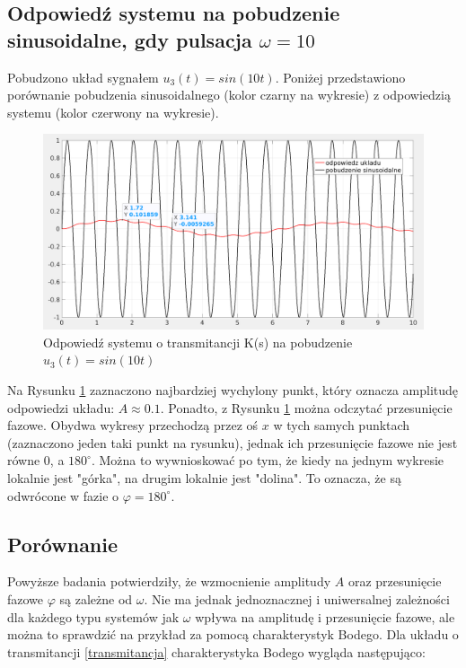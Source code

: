 \documentclass[12pt]{article}
\begin{document}
\subsection{Odpowiedź systemu na pobudzenie sinusoidalne, gdy pulsacja $\omega = 10$}
Pobudzono układ sygnałem $u_3(t)=sin(10 t)$. Poniżej przedstawiono porównanie pobudzenia sinusoidalnego (kolor czarny na wykresie) z odpowiedzią systemu (kolor czerwony na wykresie).
\begin{figure}[H]
    \centering
    \includegraphics[scale=0.2]{2.3.png}
    \caption{Odpowiedź systemu o transmitancji K(s) na pobudzenie $u_3(t)=sin(10 t)$}
    \label{fig:2.3}
\end{figure}

Na Rysunku \ref{fig:2.3} zaznaczono najbardziej wychylony punkt, który oznacza amplitudę odpowiedzi układu: $A \approx 0.1$. Ponadto, z Rysunku \ref{fig:2.3} można odczytać przesunięcie fazowe. Obydwa wykresy przechodzą przez oś $x$ w tych samych punktach (zaznaczono jeden taki punkt na rysunku), jednak ich przesunięcie fazowe nie jest równe 0, a $180 ^\circ$. Można to wywnioskować po tym, że kiedy na jednym wykresie lokalnie jest "górka", na drugim lokalnie jest "dolina". To oznacza, że są odwrócone w fazie o $\varphi = 180 ^\circ$.

\subsection{Porównanie}
Powyższe badania potwierdziły, że wzmocnienie amplitudy $A$ oraz przesunięcie fazowe $\varphi$ są zależne od $\omega$. Nie ma jednak jednoznacznej i uniwersalnej zależności dla każdego typu systemów jak $\omega$ wpływa na amplitudę i przesunięcie fazowe, ale można to sprawdzić na przykład za pomocą charakterystyk Bodego. Dla układu o transmitancji \ref{transmitancja} charakterystyka Bodego wygląda następująco:
\end{document}
